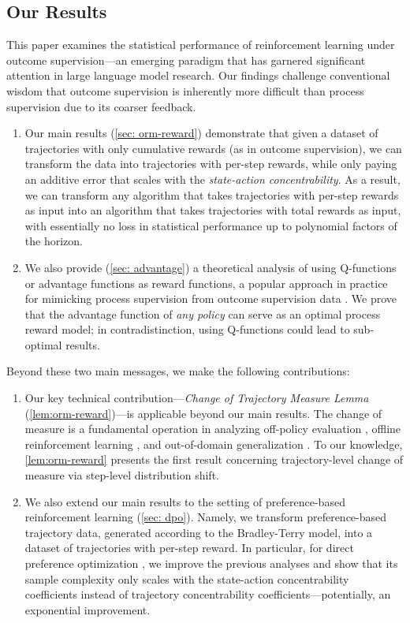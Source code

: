 \documentclass{article}
\begin{document}
\subsection{Our Results}

This paper examines the statistical performance of reinforcement learning under outcome supervision---an emerging paradigm that has garnered significant attention in large language model research. Our findings challenge conventional wisdom that outcome supervision is inherently more difficult than process supervision due to its coarser feedback.
\begin{enumerate}[label=(\arabic*)]
\item Our main results (\cref{sec: orm-reward}) demonstrate that given a dataset of trajectories with only cumulative rewards (as in outcome supervision), we can transform the data into trajectories with per-step rewards, while only paying an additive error that scales with the \textit{state-action concentrability}. As a result, we can transform any algorithm that takes trajectories with per-step rewards as input into an algorithm that takes trajectories with total rewards as input, with essentially no loss in statistical performance up to polynomial factors of the horizon.
\item We also provide (\cref{sec: advantage}) a theoretical analysis of using Q-functions or advantage functions as reward functions, a popular approach in practice for mimicking process supervision from outcome supervision data \citep[e.g.,][]{wang2024math,luo2024improve,setlur2024rewarding}. We prove that the advantage function of \emph{any policy} can serve as an optimal process reward model; in contradistinction, using Q-functions could lead to sub-optimal results.
\end{enumerate}
Beyond these two main messages, we make the following contributions:
\begin{enumerate}[label=(\arabic*)]
    \item Our key technical contribution---\emph{Change of Trajectory Measure Lemma} (\cref{lem:orm-reward})---is applicable beyond our main results. The change of measure is a fundamental operation in analyzing off-policy evaluation \citep[e.g.,][]{uehara2020minimax}, offline reinforcement learning \citep[e.g.,][]{xie2021bellman}, and out-of-domain generalization \citep{dong2022first}. To our knowledge, \cref{lem:orm-reward} presents the first result concerning trajectory-level change of measure via step-level distribution shift.
    \item We also extend our main results to the setting of preference-based reinforcement learning (\cref{sec: dpo}). Namely, we transform preference-based trajectory data, generated according to the Bradley-Terry model, into a dataset of trajectories with per-step reward. In particular, for direct preference optimization \citep{rafailov2023direct}, we improve the previous analyses and show that its sample complexity only scales with the state-action concentrability coefficients instead of trajectory concentrability coefficients---potentially, an exponential improvement.
\end{enumerate}
\end{document}
